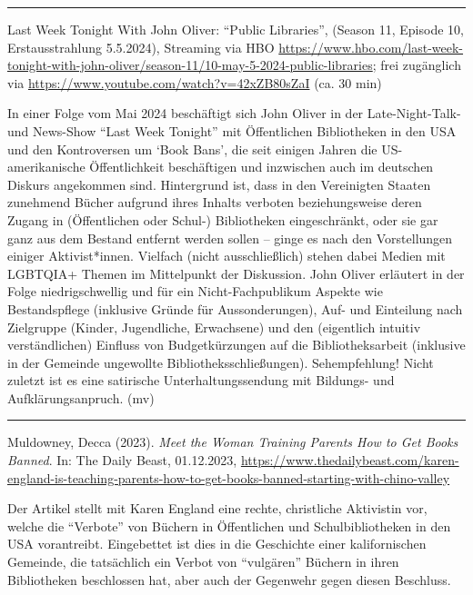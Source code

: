 \documentclass[a4paper,
fontsize=11pt,
oneside,
numbers=noperiodatend,
parskip=half-,
bibliography=totoc,
final
]{scrartcl}
\begin{document}
\begin{center}\rule{0.5\linewidth}{0.5pt}\end{center}

Last Week Tonight With John Oliver: \enquote{Public Libraries}, (Season
11, Episode 10, Erstausstrahlung 5.5.2024), Streaming via HBO
\url{https://www.hbo.com/last-week-tonight-with-john-oliver/season-11/10-may-5-2024-public-libraries};
frei zugänglich via \url{https://www.youtube.com/watch?v=42xZB80sZaI}
(ca. 30 min)

In einer Folge vom Mai 2024 beschäftigt sich John Oliver in der
Late-Night-Talk- und News-Show \enquote{Last Week Tonight} mit
Öffentlichen Bibliotheken in den USA und den Kontroversen um
\enquote*{Book Bans}, die seit einigen Jahren die US-amerikanische
Öffentlichkeit beschäftigen und inzwischen auch im deutschen Diskurs
angekommen sind. Hintergrund ist, dass in den Vereinigten Staaten
zunehmend Bücher aufgrund ihres Inhalts verboten beziehungsweise deren
Zugang in (Öffentlichen oder Schul-) Bibliotheken eingeschränkt, oder
sie gar ganz aus dem Bestand entfernt werden sollen -- ginge es nach den
Vorstellungen einiger Aktivist*innen. Vielfach (nicht ausschließlich)
stehen dabei Medien mit LGBTQIA+ Themen im Mittelpunkt der Diskussion.
John Oliver erläutert in der Folge niedrigschwellig und für ein
Nicht-Fachpublikum Aspekte wie Bestandspflege (inklusive Gründe für
Aussonderungen), Auf- und Einteilung nach Zielgruppe (Kinder,
Jugendliche, Erwachsene) und den (eigentlich intuitiv verständlichen)
Einfluss von Budgetkürzungen auf die Bibliotheksarbeit (inklusive in der
Gemeinde ungewollte Bibliotheksschließungen). Sehempfehlung! Nicht
zuletzt ist es eine satirische Unterhaltungssendung mit Bildungs- und
Aufklärungsanpruch. (mv)

\begin{center}\rule{0.5\linewidth}{0.5pt}\end{center}

Muldowney, Decca (2023). \emph{Meet the Woman Training Parents How to
Get Books Banned}. In: The Daily Beast, 01.12.2023,
\url{https://www.thedailybeast.com/karen-england-is-teaching-parents-how-to-get-books-banned-starting-with-chino-valley}

Der Artikel stellt mit Karen England eine rechte, christliche Aktivistin
vor, welche die \enquote{Verbote} von Büchern in Öffentlichen und
Schulbibliotheken in den USA vorantreibt. Eingebettet ist dies in die
Geschichte einer kalifornischen Gemeinde, die tatsächlich ein Verbot von
\enquote{vulgären} Büchern in ihren Bibliotheken beschlossen hat, aber
auch der Gegenwehr gegen diesen Beschluss.
\end{document}
